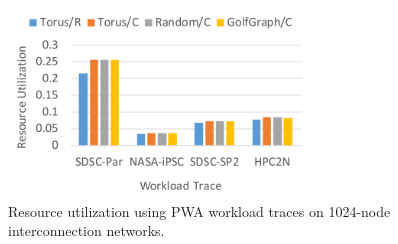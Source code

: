 \documentclass[conference]{IEEEtran}
\begin{document}
\begin{itemize}
\begin{figure}[tb]
	\centering
	\includegraphics[width=8cm]{ps/pwa-uti.pdf}
	\caption{Resource utilization using PWA workload traces on 1024-node interconnection networks.}
	\label{fig:pwa-uti}
\end{figure}

\end{itemize}

\ifx\allfiles\undefined
\end{document}

